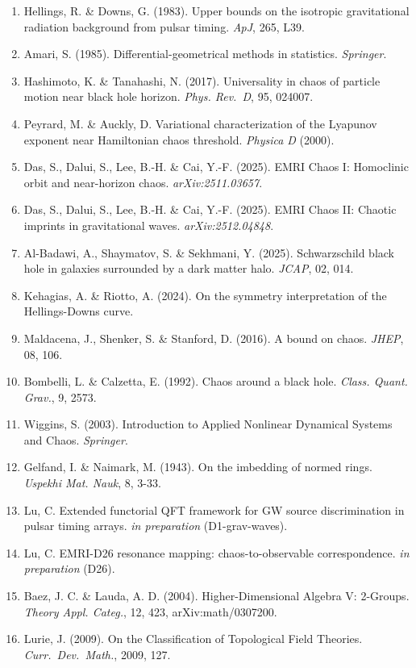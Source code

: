 \documentclass[
]{article}
\providecommand{\tightlist}{%
  \setlength{\itemsep}{0pt}\setlength{\parskip}{0pt}}
\begin{document}
\begin{enumerate}
\def\labelenumi{\arabic{enumi}.}
\tightlist
\item
  Hellings, R. \& Downs, G. (1983). Upper bounds on the isotropic
  gravitational radiation background from pulsar timing. \emph{ApJ},
  265, L39.
\item
  Amari, S. (1985). Differential-geometrical methods in statistics.
  \emph{Springer}.
\item
  Hashimoto, K. \& Tanahashi, N. (2017). Universality in chaos of
  particle motion near black hole horizon. \emph{Phys. Rev.~D}, 95,
  024007.
\item
  Peyrard, M. \& Auckly, D. Variational characterization of the Lyapunov
  exponent near Hamiltonian chaos threshold. \emph{Physica D} (2000).
\item
  Das, S., Dalui, S., Lee, B.-H. \& Cai, Y.-F. (2025). EMRI Chaos I:
  Homoclinic orbit and near-horizon chaos. \emph{arXiv:2511.03657}.
\item
  Das, S., Dalui, S., Lee, B.-H. \& Cai, Y.-F. (2025). EMRI Chaos II:
  Chaotic imprints in gravitational waves. \emph{arXiv:2512.04848}.
\item
  Al-Badawi, A., Shaymatov, S. \& Sekhmani, Y. (2025). Schwarzschild
  black hole in galaxies surrounded by a dark matter halo. \emph{JCAP},
  02, 014.
\item
  Kehagias, A. \& Riotto, A. (2024). On the symmetry interpretation of
  the Hellings-Downs curve.
\item
  Maldacena, J., Shenker, S. \& Stanford, D. (2016). A bound on chaos.
  \emph{JHEP}, 08, 106.
\item
  Bombelli, L. \& Calzetta, E. (1992). Chaos around a black hole.
  \emph{Class. Quant. Grav.}, 9, 2573.
\item
  Wiggins, S. (2003). Introduction to Applied Nonlinear Dynamical
  Systems and Chaos. \emph{Springer}.
\item
  Gelfand, I. \& Naimark, M. (1943). On the imbedding of normed rings.
  \emph{Uspekhi Mat. Nauk}, 8, 3-33.
\item
  Lu, C. Extended functorial QFT framework for GW source discrimination
  in pulsar timing arrays. \emph{in preparation} (D1-grav-waves).
\item
  Lu, C. EMRI-D26 resonance mapping: chaos-to-observable
  correspondence. \emph{in preparation} (D26).
\item
  Baez, J. C. \& Lauda, A. D. (2004). Higher-Dimensional Algebra V:
  2-Groups. \emph{Theory Appl. Categ.}, 12, 423, arXiv:math/0307200.
\item
  Lurie, J. (2009). On the Classification of Topological Field
  Theories. \emph{Curr.\ Dev.\ Math.}, 2009, 127.
\end{enumerate}
\end{document}
